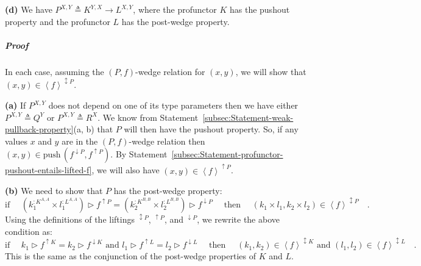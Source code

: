 \textbf{(d)} We have $P^{X,Y}\triangleq K^{Y,X}\rightarrow L^{X,Y}$,
where the profunctor $K$ has the pushout property and the profunctor
$L$ has the post-wedge property.%
\begin{comment}
\textbf{(e)} We have a recursive type $P^{X,Y}\triangleq S^{X,Y,P^{X,Y}}$,
where $S^{X,Y,R}$ is contravariant in $X$ and covariant in $Y$
and $R$, and has the post-wedge property when viewed as a profunctor
with respect to $X$ and $Y$. Does the post-wedge really hold for
$P$?
\end{comment}


\subparagraph{Proof}

In each case, assuming the $\left(P,f\right)$-wedge relation for
$(x,y)$, we will show that $(x,y)\in\left<f\right>^{\updownarrow P}$. 

\textbf{(a)} If $P^{X,Y}$ does not depend on one of its type parameters
then we have either $P^{X,Y}\triangleq Q^{Y}$ or $P^{X,Y}\triangleq R^{X}$.
We know from Statement~\ref{subsec:Statement-weak-pullback-property}(a,
b) that $P$ will then have the pushout property. So, if any values
$x$ and $y$ are in the $\left(P,f\right)$-wedge relation then $(x,y)\in\text{push}\,(f^{\downarrow P},f^{\uparrow P})$.
By Statement~\ref{subsec:Statement-profunctor-pushout-entails-lifted-f},
we will also have $(x,y)\in\left<f\right>^{\uparrow P}$.

\textbf{(b)} We need to show that $P$ has the post-wedge property:
\[
\text{if }\quad(k_{1}^{:K^{A,A}}\times l_{1}^{:L^{A,A}})\triangleright f^{\uparrow P}=(k_{2}^{:K^{B,B}}\times l_{2}^{:L^{B,B}})\triangleright f^{\downarrow P}\quad\text{ then }\quad(k_{1}\times l_{1},k_{2}\times l_{2})\in\left<f\right>^{\updownarrow P}\quad.
\]
Using the definitions of the liftings $^{\updownarrow P}$, $^{\uparrow P}$,
and $^{\downarrow P}$, we rewrite the above condition as:
\[
\text{if }\quad k_{1}\triangleright f^{\uparrow K}=k_{2}\triangleright f^{\downarrow K}\text{ and }l_{1}\triangleright f^{\uparrow L}=l_{2}\triangleright f^{\downarrow L}\quad\text{ then }\quad(k_{1},k_{2})\in\left<f\right>^{\updownarrow K}\text{ and }(l_{1},l_{2})\in\left<f\right>^{\updownarrow L}\quad.
\]
This is the same as the conjunction of the post-wedge properties of
$K$ and $L$. 

